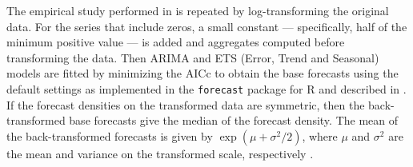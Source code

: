 \documentclass[twocolumn]{svjour3}
\begin{document}
The empirical study performed in \citet{Wick2018} is repeated by log-transforming the original data. For the series that include zeros, a small constant --- specifically, half of the minimum positive value --- is added and aggregates computed before transforming the data. Then ARIMA and ETS (Error, Trend and Seasonal) models are fitted by minimizing the AICc to obtain the base forecasts using the default settings as implemented in the \texttt{forecast} package for R \citep{forecast2016} and described in \citet{Hyndman2008}. If the forecast densities on the transformed data are symmetric, then the back-transformed base forecasts give the median of the forecast density. The mean of the back-transformed forecasts is given by $\exp\left(\mu + \sigma^2/2\right)$, where $\mu$ and $\sigma^{2}$ are the mean and variance on the transformed scale, respectively \citep[][p. 212]{Johnson1994}.
\end{document}
